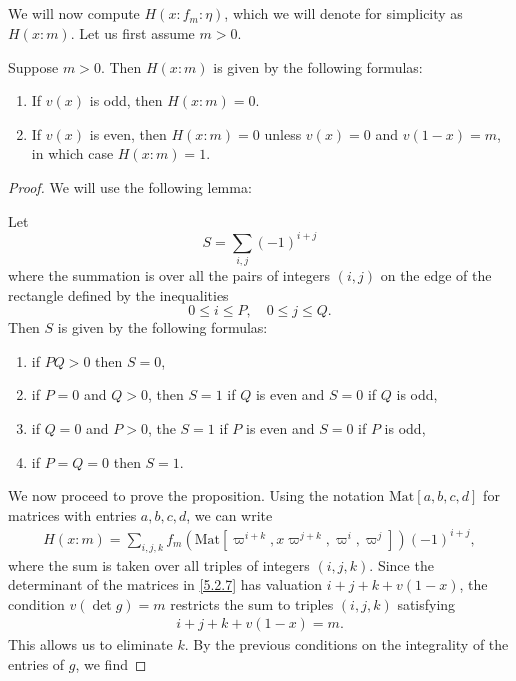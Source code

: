 \subsection{}
We will now compute $H(x: f_m: \eta)$, which we will denote for simplicity as $H(x: m)$. Let us first assume $m > 0$.
\begin{proposition}\label{prop:5.2}
Suppose $m > 0$. Then $H(x: m)$ is given by the following formulas:
\begin{enumerate}
    \item If $v(x)$ is odd, then $H(x: m) = 0$.
    \item If $v(x)$ is even, then $H(x: m) = 0$ unless $v(x) = 0$ and $v(1 - x) = m$, in which case $H(x: m) = 1$.
\end{enumerate}
\end{proposition}
\begin{proof}
We will use the following lemma:
\begin{lemma}
Let
\[
S = \sum_{i, j} (-1)^{i+j}
\]
where the summation is over all the pairs of integers $(i, j)$ on the edge of the rectangle defined by the inequalities
\[
0 \leq i \leq P, \quad 0 \leq j \leq Q.
\]
Then $S$ is given by the following formulas:
\begin{enumerate}
    \item if $PQ > 0$ then $S =0$,
    \item if $P = 0$ and $Q >0$, then $S=1$ if $Q$ is even and $S=0$ if $Q$ is odd,
    \item if $Q=0$ and $P >0$, the $S=1$ if $P$ is even and $S=0$ if $P$ is odd,
    \item if $P=Q=0$ then $S=1$.
\end{enumerate}
\end{lemma}
We now proceed to prove the proposition.
Using the notation $\mathrm{Mat}[a, b, c, d]$ for matrices with entries $a, b, c, d$, we can write
\begin{align}
\label{5.2.7}
    H(x:m) = \sum_{i, j, k} f_{m}(\mathrm{Mat}[\varpi^{i+k}, x\varpi^{j+k}, \varpi^{i}, \varpi^{j}]) (-1)^{i+j},
\end{align}
where the sum is taken over all triples of integers $(i, j, k)$.
Since the determinant of the matrices in \eqref{5.2.7} has valuation $i + j + k + v(1 - x)$, the condition $v(\det g) = m$ restricts the sum to triples $(i, j, k)$ satisfying
\begin{align*}
    i+j+k+v(1-x) = m.
\end{align*}
This allows us to eliminate $k$. By the previous conditions on the integrality of the entries of $g$, we find

\end{proof}
